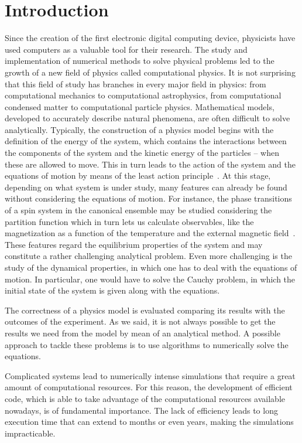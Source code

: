 \chapter{Introduction}
Since the creation of the first electronic digital computing device, physicists have used computers as a valuable tool for their research. The study and implementation of numerical methods to solve physical problems led to the growth of a new field of physics called computational physics. It is not surprising that this field of study has branches in every major field in physics: from computational mechanics to computational astrophysics, from computational condensed matter to computational particle physics. Mathematical models, developed to accurately describe natural phenomena, are often difficult to solve analytically. Typically, the construction of a physics model begins with the definition of the energy of the system, which contains the interactions between the components of the system and the kinetic energy of the particles -- when these are allowed to move. This in turn leads to the action of the system and the equations of motion by means of the least action principle~\citep{LL85}. At this stage, depending on what system is under study, many features can already be found without considering the equations of motion. For instance, the phase transitions of a spin system in the canonical ensemble may be studied considering the partition function which in turn lets us calculate observables, like the magnetization as a function of the temperature and the external magnetic field~\citep{Huang28}. These features regard the equilibrium properties of the system and may constitute a rather challenging analytical problem. Even more challenging is the study of the dynamical properties, in which one has to deal with the equations of motion. In particular, one would have to solve the Cauchy problem, in which the initial state of the system is given along with the equations.

The correctness of a physics model is evaluated comparing its results with the outcomes of the experiment. As we said, it is not always possible to get the results we need from the model by mean of an analytical method. A possible approach to tackle these problems is to use algorithms to numerically solve the equations.

Complicated systems lead to numerically intense simulations that require a great amount of computational resources. For this reason, the development of efficient code, which is able to take advantage of the computational resources available nowadays, is of fundamental importance. The lack of efficiency leads to long execution time that can extend to months or even years, making the simulations impracticable. 

